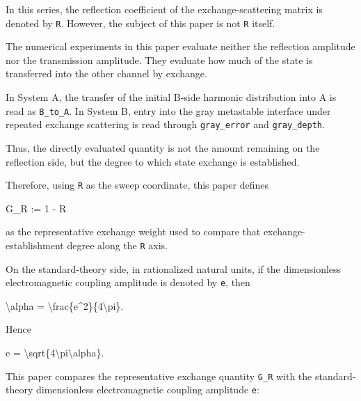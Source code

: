 \documentclass[
]{article}
\newenvironment{Shaded}{}{}
\newcommand{\NormalTok}[1]{#1}
\begin{document}
In this series, the reflection coefficient of the exchange-scattering
matrix is denoted by \texttt{R}. However, the subject of this paper is
not \texttt{R} itself.

The numerical experiments in this paper evaluate neither the reflection
amplitude nor the transmission amplitude. They evaluate how much of the
state is transferred into the other channel by exchange.

In System A, the transfer of the initial B-side harmonic distribution
into A is read as \texttt{B\_to\_A}. In System B, entry into the gray
metastable interface under repeated exchange scattering is read through
\texttt{gray\_error} and \texttt{gray\_depth}.

Thus, the directly evaluated quantity is not the amount remaining on the
reflection side, but the degree to which state exchange is established.

Therefore, using \texttt{R} as the sweep coordinate, this paper defines

\begin{Shaded}
\begin{Highlighting}[]
\NormalTok{G\_R := 1 {-} R}
\end{Highlighting}
\end{Shaded}

as the representative exchange weight used to compare that
exchange-establishment degree along the \texttt{R} axis.

On the standard-theory side, in rationalized natural units, if the
dimensionless electromagnetic coupling amplitude is denoted by
\texttt{e}, then

\begin{Shaded}
\begin{Highlighting}[]
\NormalTok{\textbackslash{}alpha = \textbackslash{}frac\{e\^{}2\}\{4\textbackslash{}pi\}.}
\end{Highlighting}
\end{Shaded}

Hence

\begin{Shaded}
\begin{Highlighting}[]
\NormalTok{e = \textbackslash{}sqrt\{4\textbackslash{}pi\textbackslash{}alpha\}.}
\end{Highlighting}
\end{Shaded}

This paper compares the representative exchange quantity \texttt{G\_R}
with the standard-theory dimensionless electromagnetic coupling
amplitude \texttt{e}:
\end{document}
